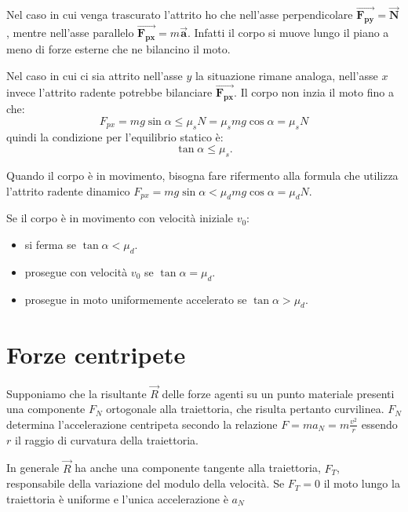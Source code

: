 \documentclass[class=book, crop=false, oneside, 12pt]{standalone}
\begin{document}
Nel caso in cui venga trascurato l'attrito ho che nell'asse perpendicolare \(\overrightarrow{\mathbf{F_{py}}} = \overrightarrow{\mathbf{N}}\), 
mentre nell'asse parallelo \(\overrightarrow{\mathbf{F_{px}}} = m \overrightarrow{\mathbf{a}}\). 
Infatti il corpo si muove lungo il piano a meno di forze esterne che ne bilancino il moto.

Nel caso in cui ci sia attrito nell'asse \(y\) la situazione rimane analoga, nell'asse \(x\) invece l'attrito radente potrebbe bilanciare \(\overrightarrow{\mathbf{F_{px}}}\).
Il corpo non inzia il moto fino a che:
\begin{equation*}
    F_{px} = m g \sin \alpha \leq \mu_s N = \mu_s m g \cos \alpha = \mu_s N
\end{equation*}
quindi la condizione per l'equilibrio statico è:
\begin{equation}
    \tan \alpha \leq \mu_s.
\end{equation}

Quando il corpo è in movimento, bisogna fare rifermento alla formula che utilizza l'attrito radente dinamico \(F_{px} = m g \sin \alpha < \mu_d m g \cos \alpha = \mu_d N\).

Se il corpo è in movimento con velocità iniziale \(v_0\):
\begin{itemize}
    \item si ferma se \(\tan \alpha < \mu_d\).
    \item prosegue con velocità \(v_0\) se \(\tan \alpha  = \mu_d\).
    \item prosegue in moto uniformemente accelerato se \(\tan \alpha > \mu_d\).
\end{itemize}

\section{Forze centripete}

Supponiamo che la risultante \(\overrightarrow{R}\) delle forze agenti su un punto materiale presenti una componente \(F_N\) ortogonale alla traiettoria, che risulta pertanto curvilinea. \(F_N\) determina l'accelerazione centripeta secondo la relazione \(F = m a_N = m \frac {v^2} {r} \) essendo \(r\) il raggio di curvatura della traiettoria.

In generale \(\overrightarrow{R}\) ha anche una componente tangente alla traiettoria, \(F_T\), responsabile della variazione del modulo della velocità. Se \(F_T = 0\) il moto lungo la traiettoria è uniforme e l'unica accelerazione è \(a_N\)
\end{document}
